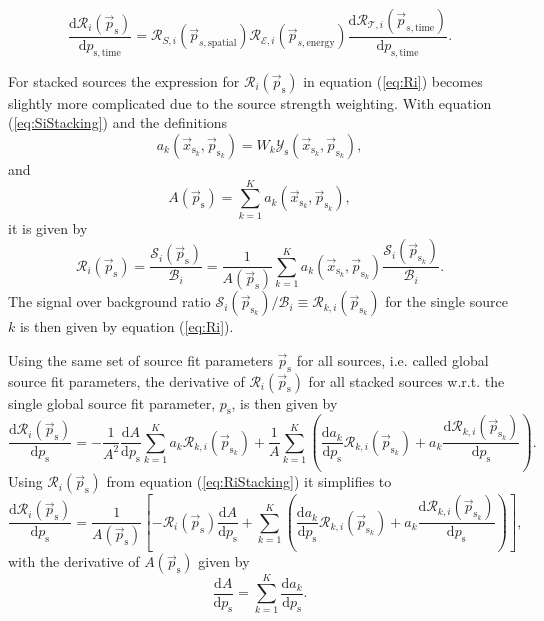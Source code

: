 \documentclass{article}
\newcommand{\ps}{\vec{p}_{\mathrm{s}}}
\newcommand{\psk}{\vec{p}_{\mathrm{s}_k}}
\newcommand{\xsk}{\vec{x}_{\mathrm{s}_k}}
\begin{document}
\begin{equation}
 \frac{\mathrm{d} \mathcal{R}_i(\ps)}{\mathrm{d} p_{\mathrm{s,time}}} = \mathcal{R}_{S,i}(\vec{p}_{s,\mathrm{spatial}}) \mathcal{R}_{\mathcal{E},i}(\vec{p}_{s,\mathrm{energy}}) \frac{\mathrm{d} \mathcal{R}_{\mathcal{T},i}(\vec{p}_{s,\mathrm{time}})}{\mathrm{d} p_{\mathrm{s,time}}}.
\end{equation}

For stacked sources the expression for $\mathcal{R}_i(\ps)$ in equation (\ref{eq:Ri})
becomes slightly more complicated due to the source strength weighting.
With equation (\ref{eq:SiStacking}) and the definitions
\begin{equation}
 a_k(\xsk,\psk) = W_k\mathcal{Y}_{\mathrm{s}}(\xsk,\psk),
\end{equation}
and
\begin{equation}
 A(\ps) = \sum_{k=1}^{K} a_k(\xsk,\psk),
\end{equation}
it is given by
\begin{equation}
\mathcal{R}_i(\ps) = \frac{\mathcal{S}_i(\ps)}{\mathcal{B}_i} = \frac{1}{A(\ps)} \sum_{k=1}^{K} a_k(\xsk,\psk) \frac{\mathcal{S}_{i}(\psk)}{\mathcal{B}_{i}}.
\label{eq:RiStacking}
\end{equation}
The signal over background ratio $\mathcal{S}_{i}(\psk) / \mathcal{B}_{i} \equiv \mathcal{R}_{k,i}(\psk)$
for the single source $k$ is then given by equation (\ref{eq:Ri}).

Using the same set of source fit parameters $\ps$ for all sources, i.e. called
global source fit parameters, the derivative of $\mathcal{R}_i(\ps)$ for
all stacked sources w.r.t. the single global source fit parameter,
$p_{\mathrm{s}}$, is then given by
\begin{equation}
 \frac{\mathrm{d} \mathcal{R}_{i}(\ps)}{\mathrm{d} p_{\mathrm{s}}} = - \frac{1}{A^2} \frac{\mathrm{d} A}{\mathrm{d} p_{\mathrm{s}}} \sum_{k=1}^{K} a_{k} \mathcal{R}_{k,i}(\psk) + \frac{1}{A}\sum_{k=1}^{K} \left( \frac{\mathrm{d} a_{k}}{\mathrm{d} p_{\mathrm{s}}}\mathcal{R}_{k,i}(\psk) + a_{k}\frac{\mathrm{d} \mathcal{R}_{k,i}(\psk)}{\mathrm{d} p_{\mathrm{s}}} \right).
\end{equation}
Using $\mathcal{R}_i(\ps)$ from equation (\ref{eq:RiStacking}) it simplifies to
\begin{equation}
 \frac{\mathrm{d} \mathcal{R}_{i}(\ps)}{\mathrm{d} p_{\mathrm{s}}} = \frac{1}{A(\ps)}\left[ -\mathcal{R}_i(\ps)\frac{\mathrm{d} A}{\mathrm{d} p_{\mathrm{s}}} + \sum_{k=1}^{K} \left( \frac{\mathrm{d} a_{k}}{\mathrm{d} p_{\mathrm{s}}}\mathcal{R}_{k,i}(\psk) + a_{k}\frac{\mathrm{d} \mathcal{R}_{k,i}(\psk)}{\mathrm{d} p_{\mathrm{s}}} \right) \right],
 \label{eq:gradRi}
\end{equation}
with the derivative of $A(\ps)$ given by
\begin{equation}
 \frac{\mathrm{d} A}{\mathrm{d} p_{\mathrm{s}}} = \sum_{k=1}^{K} \frac{\mathrm{d} a_k}{\mathrm{d} p_{\mathrm{s}}}.
\end{equation}
\end{document}
